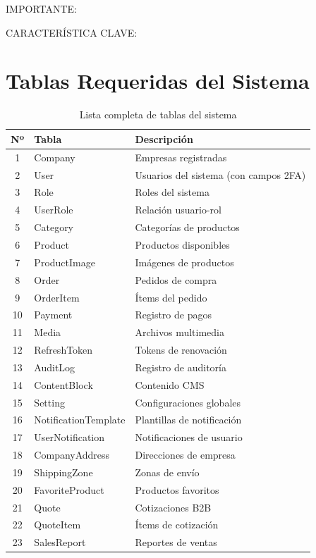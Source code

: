\documentclass[12pt,a4paper,oneside]{book}
\begin{document}
\begin{alert}{IMPORTANTE:}
\begin{info}{CARACTERÍSTICA CLAVE:}
\chapter{Tablas Requeridas del Sistema}
\label{apendice:tablas}

\begin{table}[ht]
    \centering
    \caption{Lista completa de tablas del sistema}
    \begin{tabular}{cll}
        \toprule
        \textbf{Nº} & \textbf{Tabla} & \textbf{Descripción} \\
        \midrule
        1 & Company & Empresas registradas \\
        2 & User & Usuarios del sistema (con campos 2FA) \\
        3 & Role & Roles del sistema \\
        4 & UserRole & Relación usuario-rol \\
        5 & Category & Categorías de productos \\
        6 & Product & Productos disponibles \\
        7 & ProductImage & Imágenes de productos \\
        8 & Order & Pedidos de compra \\
        9 & OrderItem & Ítems del pedido \\
        10 & Payment & Registro de pagos \\
        11 & Media & Archivos multimedia \\
        12 & RefreshToken & Tokens de renovación \\
        13 & AuditLog & Registro de auditoría \\
        14 & ContentBlock & Contenido CMS \\
        15 & Setting & Configuraciones globales \\
        16 & NotificationTemplate & Plantillas de notificación \\
        17 & UserNotification & Notificaciones de usuario \\
        18 & CompanyAddress & Direcciones de empresa \\
        19 & ShippingZone & Zonas de envío \\
        20 & FavoriteProduct & Productos favoritos \\
        21 & Quote & Cotizaciones B2B \\
        22 & QuoteItem & Ítems de cotización \\
        23 & SalesReport & Reportes de ventas \\
        \bottomrule
    \end{tabular}
\end{table}


\end{info}
\end{alert}
\end{document}
